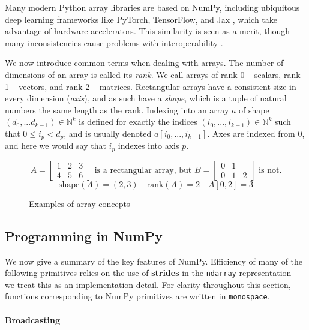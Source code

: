 Many modern Python array libraries are based on NumPy, including ubiquitous deep learning frameworks like PyTorch, TensorFlow, and Jax \cite{frostig2018compiling, paszke2019pytorch, abadi2016tensorflow}, which take advantage of hardware accelerators. This similarity is seen as a merit, though many inconsistencies cause problems with interoperability \cite{meurer2023python}.

We now introduce common terms when dealing with arrays. The number of dimensions of an array is called its \textit{rank}. We call arrays of rank 0  -- scalars, rank 1 -- vectors, and rank 2 -- matrices. Rectangular arrays have a consistent size in every dimension (\textit{axis}), and as such have a \textit{shape}, which is a tuple of natural numbers the same length as the rank. Indexing into an array $a$ of shape $(d_0, ... d_{k-1}) \in \mathbb{N}^k$ is defined for exactly the indices $(i_0, ..., i_{k-1}) \in \mathbb{N}^k$ such that $0 \le i_p < d_p$, and is usually denoted $a[i_0, ..., i_{k-1}]$. Axes are indexed from 0, and here we would say that $i_p$ indexes into axis $p$.
\begin{figure}[h]
    \centering
    $$ A = \begin{bmatrix}
        1 & 2 & 3 \\ 
        4 & 5 & 6
    \end{bmatrix} \text{ is a rectangular array, but } B = \begin{bmatrix}
    0 & 1 & \\
    0 & 1 & 2
    \end{bmatrix} \text{ is not.} $$
    $$ \mathrm{shape}(A) = (2, 3)  \quad \mathrm{rank}(A) = 2 \quad A[0, 2] = 3 $$
    \caption{Examples of array concepts}
    \label{fig:array-examples}
\end{figure}

\subsection{Programming in NumPy} 

We now give a summary of the key features of NumPy. Efficiency of many of the following primitives relies on the use of \textbf{strides} in the \texttt{ndarray} representation \cite{harris2020array} -- we treat this as an implementation detail. For clarity throughout this section, functions corresponding to NumPy primitives are written in \texttt{monospace}.

\paragraph{Broadcasting}


